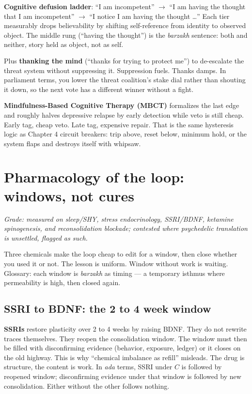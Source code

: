 \textbf{Cognitive defusion ladder}: ``I am incompetent'' $\to$ ``I am having the thought that I am incompetent'' $\to$ ``I notice I am having the thought \dots'' Each tier measurably drops believability by shifting self-reference from identity to observed object. The middle rung (``having the thought'') is the \textit{barzakh} sentence: both and neither, story held as object, not as self.

Plus \textbf{thanking the mind} (``thanks for trying to protect me'') to de-escalate the threat system without suppressing it. Suppression fuels. Thanks damps. In parliament terms, you lower the threat coalition's stake dial rather than shouting it down, so the next vote has a different winner without a fight.

\textbf{Mindfulness-Based Cognitive Therapy (MBCT)} formalizes the last edge and roughly halves depressive relapse by early detection while veto is still cheap. Early tag, cheap veto. Late tag, expensive repair. That is the same hysteresis logic as Chapter 4 circuit breakers: trip above, reset below, minimum hold, or the system flaps and destroys itself with whipsaw.

\section{Pharmacology of the loop: windows, not cures}

\textit{Grade: measured on sleep/SHY, stress endocrinology, SSRI/BDNF, ketamine spinogenesis, and reconsolidation blockade; contested where psychedelic translation is unsettled, flagged as such.}

Three chemicals make the loop cheap to edit for a window, then close whether you used it or not. The lesson is uniform. Window without work is waiting. Glossary: each window is \textit{barzakh} as timing --- a temporary isthmus where permeability is high, then closed again.

\subsection{SSRI to BDNF: the 2 to 4 week window}

\textbf{SSRIs} restore plasticity over 2 to 4 weeks by raising BDNF. They do not rewrite traces themselves. They reopen the consolidation window. The window must then be filled with disconfirming evidence (behavior, exposure, ledger) or it closes on the old highway. This is why ``chemical imbalance as refill'' misleads. The drug is structure, the content is work. In \textit{ada} terms, SSRI under $C$ is followed by reopened window; disconfirming evidence under that window is followed by new consolidation. Either without the other follows nothing.

